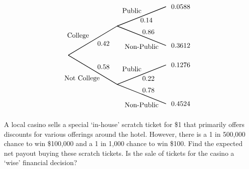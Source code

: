\documentclass[12pt,letterpaper]{exam}
\begin{document}
\begin{questions}
{\[\begin{tikzpicture}[scale= 1.0]
		\node at (0.5,1) {\FirstUpLabel};	
		\node at (0.7,-1.2) {\FirstDownLabel};	
		\node at (1.8,0.6) {\Up};
		\node at (1.8,-0.6) {\Down};
		\draw[thick] (0,0) -- (2.5,1.5);
		\draw[thick] (0,0) -- (2.5,-1.5);
		
		\node at (3.25,2.3) {\SecondUpLabel};
		\node at (3.75,0.45) {\SecondDownLabel};
		\node at (4,1.8) {\UpUp};
		\node at (4.1,1.2) {\UpDown};
		\node at (5.75,2.5) {\first};
		\node at (5.75,0.5) {\second};
		\draw[thick] (2.5,1.5) -- (5,2.5);
		\draw[thick] (2.5,1.5) -- (5,0.5);

		\node at (3.25,-0.7) {\SecondUpLabel};
		\node at (3.75,-2.55) {\SecondDownLabel};
		\node at (4.1,-1.2) {\DownUp};
		\node at (4.1,-1.8) {\DownDown};
		\node at (5.75,-0.5) {\third};	
		\node at (5.75,-2.5) {\fourth};	
		\draw[thick] (2.5,-1.5) -- (5,-0.5);
		\draw[thick] (2.5,-1.5) -- (5,-2.5);
		\end{tikzpicture}
		\]
}



\newpage
\question[10] A local casino sells a special `in-house' scratch ticket for \$1 that primarily offers discounts for various offerings around the hotel. However, there is a 1 in 500,000 chance to win \$100,000 and a 1 in 1,000 chance to win \$100. Find the expected net payout buying these scratch tickets. Is the sale of tickets for the casino a `wise' financial decision? \pspace


\end{questions}
\end{document}
